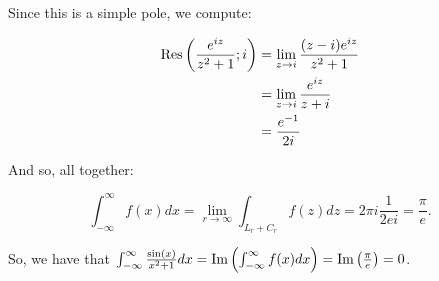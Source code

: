 \begin{ex}{}{}
Since this is a simple pole, we compute:

\begin{align*}\mathrm{Res}\left(\frac{e^{iz}}{z^2+1}; i\right) &= \lim_{z\rightarrow i} \frac{(z-i)e^{iz}}{z^2+1}\\
&= \lim_{z\rightarrow i} \frac{e^{iz}}{z+i}\\
&= \frac{e^{-1}}{2i}
\end{align*}

And so, all together:

$$\int_{-\infty}^\infty f(x)dx = \lim_{r\rightarrow \infty} \int_{L_r+C_r}f(z)dz = 2\pi i\frac{1}{2ei} = \frac{\pi}{e}.$$

So, we have that $\int_{-\infty}^\infty \frac{\sin(x)}{x^2+1}dx = \operatorname{Im} \left(\int_{-\infty}^\infty f(x)dx\right) = \operatorname{Im}\left(\frac{\pi}{e}\right) = 0$.

\end{ex}
